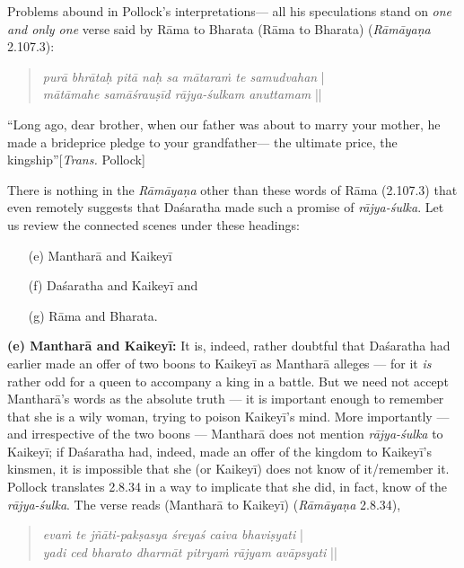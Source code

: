 Problems abound in Pollock’s interpretations— all his speculations stand on {\sl one and only one} verse said by Rāma to Bharata (Rāma to Bharata) ({\sl Rāmāyaṇa} 2.107.3): 
\begin{quote}
{{\sl purā bhrātaḥ pitā naḥ sa mātaraṁ te samudvahan}}\label{verse33} |\\
{\sl mātāmahe samāśrauṣīd rājya-śulkam anuttamam} || 
\end{quote}

\begin{myquote}
“Long ago, dear brother, when our father was about to marry your mother, he made a brideprice pledge to your grandfather--- the ultimate price, the kingship”\hfill [{\sl Trans.} Pollock]
\end{myquote}

There is nothing in the {\sl Rāmāyaṇa} other than these words of Rāma (2.107.3) that even remotely suggests that Daśaratha made such a promise of {\sl rājya-śulka}. Let us review the connected scenes under these headings: 
\begin{itemize}
\itemsep=0pt
\item[(e)] Mantharā and Kaikeyī 
\item[(f)] Daśaratha and Kaikeyī and 
\item[(g)] Rāma and Bharata.
\end{itemize}

\noindent
\textbf{(e) Mantharā and Kaikeyī:} It is, indeed, rather doubtful that Daśaratha had earlier made an offer of two boons to Kaikeyī as Mantharā alleges --- for it {\sl is} rather odd for a queen to accompany a king in a battle. But we need not accept Mantharā’s words as the absolute truth --- it is important enough to remember that she is a wily woman, trying to poison Kaikeyī’s mind.  More importantly --- and irrespective of the two boons --- Mantharā does not mention {\sl rājya-śulka} to Kaikeyī; if Daśaratha had, indeed, made an offer of the kingdom to Kaikeyī’s kinsmen, it is impossible that she (or Kaikeyī) does not know of it/remember it. Pollock translates 2.8.34 in a way to implicate that she did, in fact, know of the {\sl rājya-śulka}. The verse reads (Mantharā to Kaikeyī) ({\sl Rāmāyaṇa} 2.8.34), 
\begin{quote}
{{\sl evaṁ te jñāti-pakṣasya śreyaś caiva bhaviṣyati}}\label{verse14} |\\
{\sl yadi ced bharato dharmāt pitryaṁ rājyam avāpsyati} || 
\end{quote}

